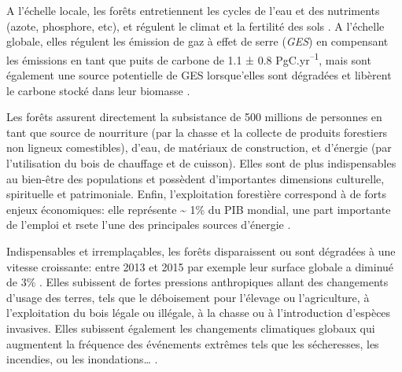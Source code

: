\documentclass[
  11pt,
  french,
  A4paper,
  extrafontsizes,onecolumn,openright
  ]{memoir}
\begin{document}
A l'échelle locale, les forêts entretiennent les cycles de l'eau et des
nutriments (azote, phosphore, etc), et régulent le climat et la
fertilité des sols \autocites{Malhi2008}{Isbell2017}. A l'échelle
globale, elles régulent les émission de gaz à effet de serre
(\emph{GES}) en compensant les émissions en tant que puits de carbone de
1.1 ± 0.8 PgC.yr\textsuperscript{--1}, mais sont également une source
potentielle de GES lorsque'elles sont dégradées et libèrent le carbone
stocké dans leur biomasse \autocites{Pan2011}{Roy2017}.

Les forêts assurent directement la subsistance de 500 millions de
personnes en tant que source de nourriture (par la chasse et la collecte
de produits forestiers non ligneux comestibles), d'eau, de matériaux de
construction, et d'énergie (par l'utilisation du bois de chauffage et de
cuisson). Elles sont de plus indispensables au bien-être des populations
et possèdent d'importantes dimensions culturelle, spirituelle et
patrimoniale. Enfin, l'exploitation forestière correspond à de forts
enjeux économiques: elle représente \textasciitilde{} 1\% du PIB
mondial, une part importante de l'emploi et rsete l'une des principales
sources d'énergie \autocites{CBDdiversity2011}{FAO2014}.

Indispensables et irremplaçables, les forêts disparaissent ou sont
dégradées à une vitesse croissante: entre 2013 et 2015 par exemple leur
surface globale a diminué de 3\% \autocite{FAO2009}. Elles subissent de
fortes pressions anthropiques allant des changements d'usage des terres,
tels que le déboisement pour l'élevage ou l'agriculture, à
l'exploitation du bois légale ou illégale, à la chasse ou à
l'introduction d'espèces invasives. Elles subissent également les
changements climatiques globaux qui augmentent la fréquence des
événements extrêmes tels que les sécheresses, les incendies, ou les
inondations\ldots{} \autocite{Pachauri2014}.
\end{document}
